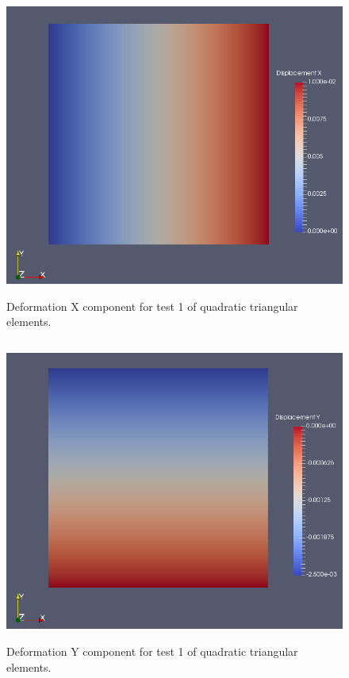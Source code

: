 \documentclass[a4paper, 12pt]{article}
\begin{document}
\begin{figure}[H]
  \centering
  \includegraphics[width=13cm, height=10cm]{Qtri_4_t1_disp_X}
  \caption{Deformation X component for test 1 of quadratic
            triangular elements.}
  \label{fig:quadTri1_x}
\end{figure}

\begin{figure}[H]
  \centering
  \includegraphics[width=13cm, height=10cm]{Qtri_4_t1_disp_Y}
  \caption{Deformation Y component for test 1 of quadratic
            triangular elements.}
  \label{fig:quadTri1_y}
\end{figure}
\end{document}
